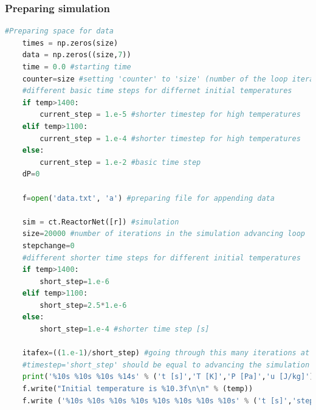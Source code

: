 \documentclass[a4paper]{article}
\begin{document}
\subsubsection{Preparing simulation}
\begin{lstlisting}[language=python]
    #Preparing space for data 
    times = np.zeros(size)
    data = np.zeros((size,7))   
    time = 0.0 #starting time
    counter=size #setting 'counter' to 'size' (number of the loop iterations)
    #different basic time steps for differnet initial temperatures
    if temp>1400:
        current_step = 1.e-5 #shorter timestep for high temperatures
    elif temp>1100:
        current_step = 1.e-4 #shorter timestep for high temperatures
    else:
        current_step = 1.e-2 #basic time step
    dP=0
    
    f=open('data.txt', 'a') #preparing file for appending data
    
    sim = ct.ReactorNet([r]) #simulation
    size=20000 #number of iterations in the simulation advancing loop
    stepchange=0
    #different shorter time steps for different initial temperatures
    if temp>1400:
        short_step=1.e-6
    elif temp>1100:
        short_step=2.5*1.e-6
    else:
        short_step=1.e-4 #shorter time step [s] 
        
    itafex=((1.e-1)/short_step) #going through this many iterations at specified 
    #timestep='short_step' should be equal to advancing the simulation by 0.1 seconds
    print('%10s %10s %10s %14s' % ('t [s]','T [K]','P [Pa]','u [J/kg]'))    
    f.write("Initial temperature is %10.3f\n\n" % (temp))
    f.write ('%10s %10s %10s %10s %10s %10s %10s %10s' % ('t [s]','step [s]','dT [K]','T [K]', 'dP [Pa]', 'P [Pa]', 'licznik', 'iteration\n'))
\end{lstlisting}
\end{document}
